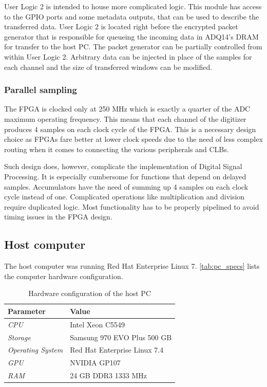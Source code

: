User Logic 2 is intended to house more complicated logic.
This module has access to the GPIO ports and some metadata
outputs, that can be used to describe the transferred data.
User Logic 2 is located right before the encrypted packet generator
that is responsible for queueing the incoming data in ADQ14's DRAM 
for transfer to the host PC. The packet generator can be partially
controlled from within User Logic 2. Arbitrary data can be injected
in place of the samples for each channel and the size of transferred windows 
can be modified.

\subsubsection{Parallel sampling} \label{sssec:parallel_sampling}

The FPGA is clocked only at 250 MHz which is exactly a quarter of 
the ADC maximum operating frequency. This means that each channel
of the digitizer produces 4 samples on each clock cycle of the 
FPGA. This is a necessary design choice as FPGAs fare better 
at lower clock speeds due to the need of less complex routing
when it comes to connecting the various peripherals and CLBs.


Such design does, however, complicate the implementation of 
Digital Signal Processing. It is especially cumbersome for 
functions that depend on delayed samples.
Accumulators have the need of summing up 4 samples on
each clock cycle instead of one. Complicated operations
like multiplication and division require duplicated logic.
Most functionality has to be properly pipelined to avoid
timing issues in the FPGA design.

\subsection{Host computer}

The host computer was running Red Hat Enterprise Linux 7.
\autoref{tab:pc_specs} lists the computer hardware configuration.
\begin{table}[H]
\caption{Hardware configuration of the host PC}
\centering
  \begin{tabular}{l | l}
  {\bfseries Parameter} & {\bfseries Value}\\
  \hline
  \textit {CPU}             & Intel Xeon C5549 \\ \hline
  \textit {Storage}  & Samsung 970 EVO Plus 500 GB \\ \hline
  \textit {Operating System}   & Red Hat Enterprise Linux 7.4\\ \hline
  \textit {GPU}         & NVIDIA GP107 \\ \hline
  \textit {RAM}      & 24 GB DDR3 1333 MHz\\ 
  \end{tabular}
  \label{tab:pc_specs}
\end{table}

